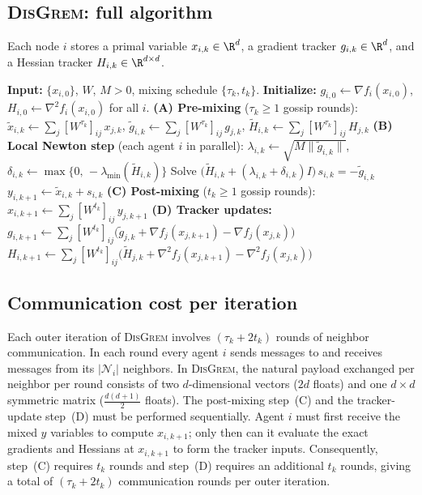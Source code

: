 \documentclass[review,onefignum,onetabnum]{siamart171218}
\begin{document}
	\subsection{\textsc{DisGrem}: full algorithm}\label{ssec:disgrem}
	
	Each node $i$ stores a primal variable $x_{i,k}\in\R^d$, a gradient tracker $g_{i,k}\in\R^d$,
	and a Hessian tracker $H_{i,k}\in\R^{d\times d}$.
	
	\begin{algorithm}[htbp]
\caption{\textsc{DisGrem}}
\label{alg:disgrem}
\small
\begin{algorithmic}[1]
\State \textbf{Input:} $\{x_{i,0}\}$, $W$, $M>0$, mixing schedule $\{\tau_k, t_k\}$.
\State \textbf{Initialize:} $g_{i,0}\gets\nabla f_i(x_{i,0})$, $H_{i,0}\gets\nabla^2 f_i(x_{i,0})$ for all $i$.
\State \textbf{(A) Pre-mixing} ($\tau_k\ge 1$ gossip rounds):
\Statex\qquad $\tilde x_{i,k}\gets\textstyle\sum_j [W^{\tau_k}]_{ij}\,x_{j,k}$,\quad
  $\tilde g_{i,k}\gets\textstyle\sum_j [W^{\tau_k}]_{ij}\,g_{j,k}$,\quad
  $\tilde H_{i,k}\gets\textstyle\sum_j [W^{\tau_k}]_{ij}\,H_{j,k}$
\State \textbf{(B) Local Newton step} (each agent $i$ in parallel):
\Statex\qquad $\lambda_{i,k}\gets\sqrt{M\|\tilde g_{i,k}\|}$,\quad
  $\delta_{i,k}\gets\max\{0,\,-\lambda_{\min}(\tilde H_{i,k})\}$
\Statex\qquad Solve $\bigl(\tilde H_{i,k}+(\lambda_{i,k}+\delta_{i,k})I\bigr)\,s_{i,k}=-\tilde g_{i,k}$
\Statex\qquad $y_{i,k+1}\gets\tilde x_{i,k}+s_{i,k}$
\State \textbf{(C) Post-mixing} ($t_k\ge 1$ gossip rounds):
\Statex\qquad $x_{i,k+1}\gets\textstyle\sum_j [W^{t_k}]_{ij}\,y_{j,k+1}$
\State \textbf{(D) Tracker updates:}
\Statex\qquad $g_{i,k+1}\gets\textstyle\sum_j [W^{t_k}]_{ij}\bigl(\tilde g_{j,k}+\nabla f_j(x_{j,k+1})-\nabla f_j(x_{j,k})\bigr)$
\Statex\qquad $H_{i,k+1}\gets\textstyle\sum_j [W^{t_k}]_{ij}\bigl(\tilde H_{j,k}+\nabla^2 f_j(x_{j,k+1})-\nabla^2 f_j(x_{j,k})\bigr)$
\EndFor
\end{algorithmic}
\end{algorithm}
	
\subsection{Communication cost per iteration}\label{ssec:comm}

Each outer iteration of \textsc{DisGrem} involves $(\tau_k + 2t_k)$ rounds of neighbor communication.
In each round every agent $i$ sends messages to and receives messages from its $|\mathcal N_i|$ neighbors.
In \textsc{DisGrem}, the natural payload exchanged per neighbor per round consists of
two $d$-dimensional vectors ($2d$ floats) and
one $d\times d$ symmetric matrix ($\tfrac{d(d+1)}{2}$ floats).
The post-mixing step~(C) and the tracker-update step~(D) must be performed sequentially.
Agent $i$ must first receive the mixed $y$ variables to compute $x_{i,k+1}$; only then can it evaluate the exact gradients and Hessians at $x_{i,k+1}$ to form the tracker inputs.
Consequently, step~(C) requires $t_k$ rounds and step~(D) requires an additional $t_k$ rounds, giving a total of $(\tau_k+2t_k)$ communication rounds per outer iteration.
\end{document}
